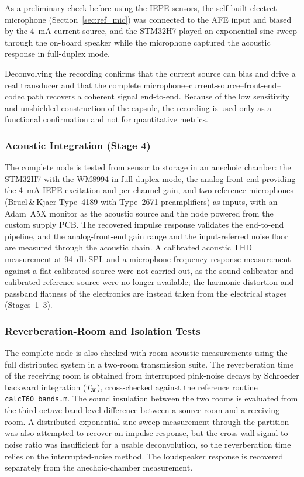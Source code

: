 As a preliminary check before using the IEPE sensors, the self-built electret microphone (Section~\ref{sec:ref_mic}) was connected to the AFE input and biased by the \SI{4}{\milli\ampere} current source, and the STM32H7 played an exponential sine sweep through the on-board speaker while the microphone captured the acoustic response in full-duplex mode.

Deconvolving the recording confirms that the current source can bias and drive a real transducer and that the complete microphone--current-source--front-end--codec path recovers a coherent signal end-to-end. Because of the low sensitivity and unshielded construction of the capsule, the recording is used only as a functional confirmation and not for quantitative metrics.

\subsubsection{Acoustic Integration (Stage 4)}

The complete node is tested from sensor to storage in an anechoic chamber: the STM32H7 with the WM8994 in full-duplex mode, the analog front end providing the \SI{4}{\milli\ampere} IEPE excitation and per-channel gain, and two reference microphones (Bruel\,\&\,Kjaer Type~4189 with Type~2671 preamplifiers) as inputs, with an Adam~A5X monitor as the acoustic source and the node powered from the custom supply PCB. The recovered impulse response validates the end-to-end pipeline, and the analog-front-end gain range and the input-referred noise floor are measured through the acoustic chain. A calibrated acoustic THD measurement at \SI{94}{\decibel} SPL and a microphone frequency-response measurement against a flat calibrated source were not carried out, as the sound calibrator and calibrated reference source were no longer available; the harmonic distortion and passband flatness of the electronics are instead taken from the electrical stages (Stages~1--3).

\subsubsection{Reverberation-Room and Isolation Tests}

The complete node is also checked with room-acoustic measurements using the full distributed system in a two-room transmission suite. The reverberation time of the receiving room is obtained from interrupted pink-noise decays by Schroeder backward integration ($T_{30}$), cross-checked against the reference routine \texttt{calcT60\_bands.m}. The sound insulation between the two rooms is evaluated from the third-octave band level difference between a source room and a receiving room. A distributed exponential-sine-sweep measurement through the partition was also attempted to recover an impulse response, but the cross-wall signal-to-noise ratio was insufficient for a usable deconvolution, so the reverberation time relies on the interrupted-noise method. The loudspeaker response is recovered separately from the anechoic-chamber measurement.
